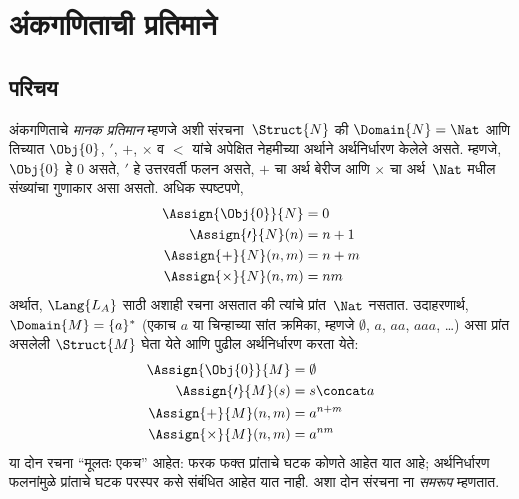 \chapter{अंकगणिताची प्रतिमाने}\label{mod:mar::chap}








\section{परिचय}\label{mod:mar:int:sec}

अंकगणिताचे \emph{मानक प्रतिमान} म्हणजे अशी संरचना~$\Struct{N}$ की
$\Domain{N} = \Nat$ आणि तिच्यात $\Obj{0}$, $\prime$, $+$, $\times$ व
$<$ यांचे अपेक्षित नेहमीच्या अर्थाने अर्थनिर्धारण केलेले असते. म्हणजे,
$\Obj{0}$ हे $0$ असते, $\prime$ हे उत्तरवर्ती फलन असते, $+$ चा अर्थ
बेरीज आणि $\times$ चा अर्थ~$\Nat$ मधील संख्यांचा गुणाकार असा असतो.
अधिक स्पष्टपणे,
\begin{align*}
  \Assign{\Obj{0}}{N} & = 0\\
  \Assign{\prime}{N}(n) & = n + 1\\
  \Assign{+}{N}(n, m) & = n + m\\
  \Assign{\times}{N}(n, m) & = nm
\end{align*}
अर्थात, $\Lang{L_A}$ साठी अशाही रचना असतात की त्यांचे प्रांत~$\Nat$
नसतात. उदाहरणार्थ, $\Domain{M} = \{a\}^*$ (एकाच $a$ या चिन्हाच्या
सांत क्रमिका, म्हणजे $\emptyset$, $a$, $aa$, $aaa$, \dots) असा प्रांत
असलेली $\Struct{M}$ घेता येते आणि पुढील अर्थनिर्धारण करता येते:
\begin{align*}
  \Assign{\Obj{0}}{M} & = \emptyset\\
  \Assign{\prime}{M}(s) & = s \concat a\\
  \Assign{+}{M}(n, m) & = a^{n + m}\\
  \Assign{\times}{M}(n, m) & = a^{nm}
\end{align*}
या दोन रचना ``मूलतः एकच'' आहेत: फरक फक्त प्रांताचे
घटक कोणते आहेत यात आहे; अर्थनिर्धारण फलनांमुळे प्रांताचे
घटक परस्पर कसे संबंधित आहेत यात नाही. अशा दोन संरचना ना
\emph{समरूप} म्हणतात.

